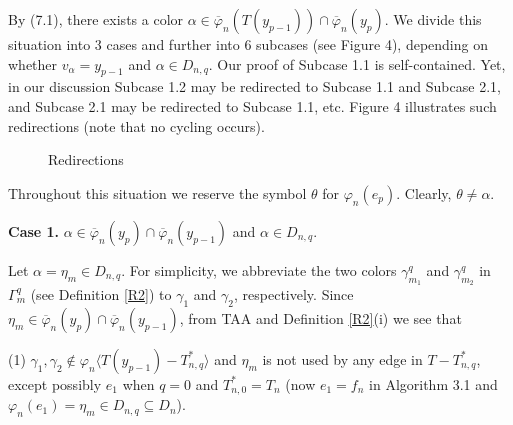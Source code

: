\documentclass[11pt]{article}
\begin{document}
By (7.1), there exists a color $\alpha\in \overline{\varphi}_n(T(y_{p-1}))\cap\overline{\varphi}_n(y_p)$. 
We divide this situation into $3$ cases and further into $6$ subcases (see Figure 4), depending on whether 
$v_{\alpha}=y_{p-1}$ and $\alpha \in D_{n,q}$. Our proof of Subcase 1.1 is self-contained. Yet, in our discussion 
Subcase 1.2 may be redirected to Subcase 1.1 and Subcase 2.1, and Subcase 2.1 may be redirected to Subcase 1.1, etc. 
Figure 4 illustrates such redirections (note that no cycling occurs). 
\begin{figure}[htpb]
\vspace{-1mm}
\centering
{}
\vspace{-1mm}\caption{Redirections}
\end{figure}

Throughout this situation we reserve the symbol $\theta$ for $\varphi_n(e_p)$. Clearly, $\theta\neq \alpha$. 


\vskip 2mm
{\bf Case 1.} $\alpha\in\overline{\varphi}_n(y_p)\cap\overline{\varphi}_n(y_{p-1})$ and  $\alpha \in D_{n,q}$.

\vskip 1mm
Let $\alpha=\eta_{m}\in D_{n,q}$. For simplicity, we abbreviate the two colors $\gamma^{q}_{m_1}$ and $\gamma^{q}_{m_2}$ in $\Gamma^{q}_m$ (see Definition \ref{R2}) to $\gamma_1$ and $\gamma_2$, respectively. 
Since $\eta_m \in \overline{\varphi}_n(y_p)\cap\overline{\varphi}_n(y_{p-1})$, from TAA and Definition \ref{R2}(i) we 
see that

(1) $\gamma_{1},\gamma_{2}\notin \varphi_n \langle T(y_{p-1}) -  T_{n,q}^* \rangle$ and $\eta_m$ is not used by 
any edge in $T -  T_{n,q}^*$, except possibly $e_1$ when $q=0$ and $T_{n,0}^*=T_n$ (now $e_1=f_n$ in Algorithm 3.1 
and $\varphi_n(e_1)=\eta_m \in  D_{n,q} \subseteq D_n$). 
\end{document}
